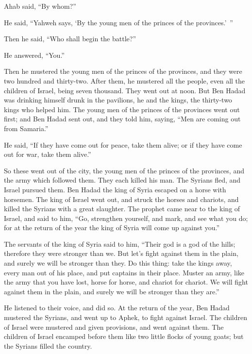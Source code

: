 {\par }{\PP {}Ahab said, “By whom?”
\par }{\PP He said, “Yahweh says, ‘By the young men of the princes of the provinces.’ ”
\par }{\PP Then he said, “Who shall begin the battle?”
\par }{\PP He answered, “You.”
\par }{\PP {}Then he mustered the young men of the princes of the provinces, and they were two hundred and thirty-two. After them, he mustered all the people, even all the children of Israel, being seven thousand.
They went out at noon. But Ben Hadad was drinking himself drunk in the pavilions, he and the kings, the thirty-two kings who helped him.
The young men of the princes of the provinces went out first; and Ben Hadad sent out, and they told him, saying, “Men are coming out from Samaria.”
\par }{\PP {}He said, “If they have come out for peace, take them alive; or if they have come out for war, take them alive.”
\par }{\PP {}So these went out of the city, the young men of the princes of the provinces, and the army which followed them.
They each killed his man. The Syrians fled, and Israel pursued them. Ben Hadad the king of Syria escaped on a horse with horsemen.
The king of Israel went out, and struck the horses and chariots, and killed the Syrians with a great slaughter.
The prophet came near to the king of Israel, and said to him, “Go, strengthen yourself, and mark, and see what you do; for at the return of the year the king of Syria will come up against you.”
\par }{\PP {}The servants of the king of Syria said to him, “Their god is a god of the hills; therefore they were stronger than we. But let’s fight against them in the plain, and surely we will be stronger than they.
Do this thing: take the kings away, every man out of his place, and put captains in their place.
Muster an army, like the army that you have lost, horse for horse, and chariot for chariot. We will fight against them in the plain, and surely we will be stronger than they are.”
\par }{\PP He listened to their voice, and did so.
At the return of the year, Ben Hadad mustered the Syrians, and went up to Aphek, to fight against Israel.
The children of Israel were mustered and given provisions, and went against them. The children of Israel encamped before them like two little flocks of young goats; but the Syrians filled the country.
}
